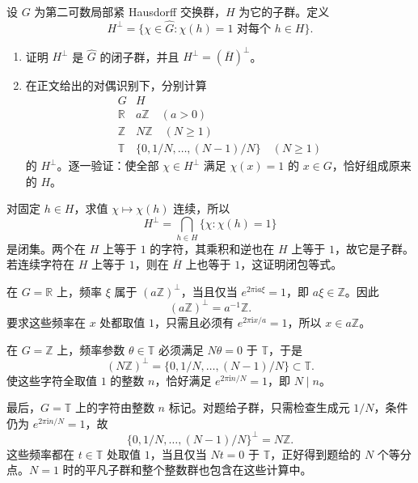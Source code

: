 \begin{exercise}[子群的零化子]
\label{b2:ex:I3-annihilators}
设 \(G\) 为第二可数局部紧 Hausdorff 交换群，\(H\) 为它的子群。定义
\[
 H^\perp=\{\chi\in\widehat G:\chi(h)=1\text{ 对每个 }h\in H\}.
\]
\begin{enumerate}
\item\label{b2:item:I3-annihilators-closed}
证明 \(H^\perp\) 是 \(\widehat G\) 的闭子群，并且 \(H^\perp=(\overline H)^\perp\)。
\item\label{b2:item:I3-annihilators-models}
在正文给出的对偶识别下，分别计算
\[
 \begin{array}{c|c}
 G&H\\\hline
 \mathbb R&a\mathbb Z\quad(a>0)\\
 \mathbb Z&N\mathbb Z\quad(N\ge1)\\
 \mathbb T&\{0,1/N,\ldots,(N-1)/N\}\quad(N\ge1)
 \end{array}
\]
的 \(H^\perp\)。逐一验证：使全部 \(\chi\in H^\perp\) 满足 \(\chi(x)=1\) 的 \(x\in G\)，恰好组成原来的 \(H\)。
\end{enumerate}
\end{exercise}
\begin{solution}
对固定 \(h\in H\)，求值 \(\chi\mapsto\chi(h)\) 连续，所以
\[
 H^\perp=\bigcap_{h\in H}\{\chi:\chi(h)=1\}
\]
是闭集。两个在 \(H\) 上等于 \(1\) 的字符，其乘积和逆也在 \(H\) 上等于 \(1\)，故它是子群。若连续字符在 \(H\) 上等于 \(1\)，则在 \(\overline H\) 上也等于 \(1\)，这证明闭包等式。

在 \(G=\mathbb R\) 上，频率 \(\xi\) 属于 \((a\mathbb Z)^\perp\)，当且仅当 \(e^{2\pi\mathrm i a\xi}=1\)，即 \(a\xi\in\mathbb Z\)。因此
\[
 (a\mathbb Z)^\perp=a^{-1}\mathbb Z.
\]
要求这些频率在 \(x\) 处都取值 \(1\)，只需且必须有 \(e^{2\pi\mathrm ix/a}=1\)，所以 \(x\in a\mathbb Z\)。

在 \(G=\mathbb Z\) 上，频率参数 \(\theta\in\mathbb T\) 必须满足 \(N\theta=0\) 于 \(\mathbb T\)，于是
\[
 (N\mathbb Z)^\perp=\{0,1/N,\ldots,(N-1)/N\}\subset\mathbb T.
\]
使这些字符全取值 \(1\) 的整数 \(n\)，恰好满足 \(e^{2\pi\mathrm in/N}=1\)，即 \(N\mid n\)。

最后，\(G=\mathbb T\) 上的字符由整数 \(n\) 标记。对题给子群，只需检查生成元 \(1/N\)，条件仍为 \(e^{2\pi\mathrm in/N}=1\)，故
\[
 \{0,1/N,\ldots,(N-1)/N\}^\perp=N\mathbb Z.
\]
这些频率都在 \(t\in\mathbb T\) 处取值 \(1\)，当且仅当 \(Nt=0\) 于 \(\mathbb T\)，正好得到题给的 \(N\) 个等分点。\(N=1\) 时的平凡子群和整个整数群也包含在这些计算中。
\end{solution}

